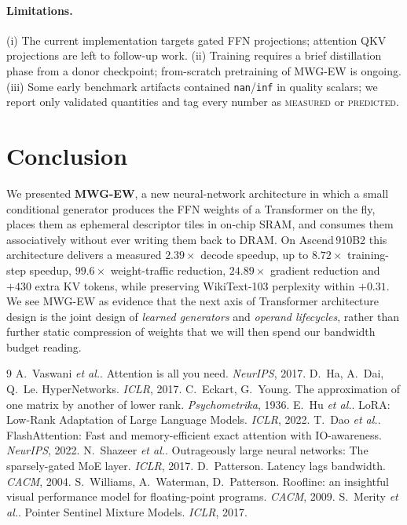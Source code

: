\documentclass[11pt]{article}
\theoremstyle{definition}
\newcommand{\etal}{\textit{et al.}}
\begin{document}
\paragraph{Limitations.}
(i) The current implementation targets gated FFN projections; attention QKV projections are left to follow-up work.
(ii) Training requires a brief distillation phase from a donor checkpoint; from-scratch pretraining of MWG-EW is ongoing.
(iii) Some early benchmark artifacts contained \texttt{nan}/\texttt{inf} in quality scalars; we report only validated quantities and tag every number as \textsc{measured} or \textsc{predicted}.

\section{Conclusion}

We presented \textbf{MWG-EW}, a new neural-network architecture in which a small conditional generator produces the FFN weights of a Transformer on the fly, places them as ephemeral descriptor tiles in on-chip SRAM, and consumes them associatively without ever writing them back to DRAM. On Ascend\,910B2 this architecture delivers a measured $2.39\times$ decode speedup, up to $8.72\times$ training-step speedup, $99.6\times$ weight-traffic reduction, $24.89\times$ gradient reduction and $+430$ extra KV tokens, while preserving WikiText-103 perplexity within $+0.31$. We see MWG-EW as evidence that the next axis of Transformer architecture design is the joint design of \emph{learned generators} and \emph{operand lifecycles}, rather than further static compression of weights that we will then spend our bandwidth budget reading.

\small

\begin{thebibliography}{9}
 A.~Vaswani \etal. Attention is all you need. \emph{NeurIPS}, 2017.
 D.~Ha, A.~Dai, Q.~Le. HyperNetworks. \emph{ICLR}, 2017.
 C.~Eckart, G.~Young. The approximation of one matrix by another of lower rank. \emph{Psychometrika}, 1936.
 E.~Hu \etal. LoRA: Low-Rank Adaptation of Large Language Models. \emph{ICLR}, 2022.
 T.~Dao \etal. FlashAttention: Fast and memory-efficient exact attention with IO-awareness. \emph{NeurIPS}, 2022.
 N.~Shazeer \etal. Outrageously large neural networks: The sparsely-gated MoE layer. \emph{ICLR}, 2017.
 D.~Patterson. Latency lags bandwidth. \emph{CACM}, 2004.
 S.~Williams, A.~Waterman, D.~Patterson. Roofline: an insightful visual performance model for floating-point programs. \emph{CACM}, 2009.
 S.~Merity \etal. Pointer Sentinel Mixture Models. \emph{ICLR}, 2017.
\end{thebibliography}
\end{document}
